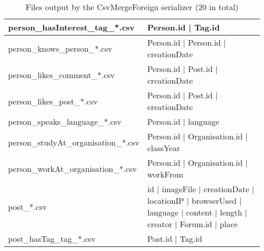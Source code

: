 \begin{table}[htb]
{\begin{tabular}{|p{4.3cm}|p{12.4cm}|}
        person\_hasInterest\_tag\_*.csv      & Person.id | Tag.id                                                                                                  \\ \hline
        person\_knows\_person\_*.csv         & Person.id | Person.id | creationDate                                                                                \\ \hline
        person\_likes\_comment\_*.csv        & Person.id | Post.id | creationDate                                                                                  \\ \hline
        person\_likes\_post\_*.csv           & Person.id | Post.id | creationDate                                                                                  \\ \hline
        person\_speaks\_language\_*.csv      & Person.id | language                                                                                                \\ \hline
        person\_studyAt\_organisation\_*.csv & Person.id | Organisation.id | classYear                                                                             \\ \hline
        person\_workAt\_organisation\_*.csv  & Person.id | Organisation.id | workFrom                                                                              \\ \hline
        post\_*.csv                          & id | imageFile | creationDate | locationIP | browserUsed | language | content | length | creator | Forum.id | place \\ \hline
        post\_hasTag\_tag\_*.csv             & Post.id | Tag.id                                                                                                    \\ \hline
    \end{tabular}}
    \caption{Files output by the CsvMergeForeign serializer (20 in total)}
    \label{table:csv_merge_foreign}
\end{table}
